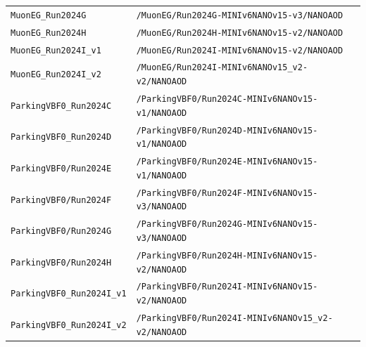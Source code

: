 \begin{longtable}{@{}>{\RaggedRight\arraybackslash}p{} >{\RaggedRight\arraybackslash}p{}@{}}
\addlinespace[2pt]
\texttt{MuonEG\_\allowbreak{}Run2024G} & \texttt{/\allowbreak{}MuonEG/\allowbreak{}Run2024G-\allowbreak{}MINIv6NANOv15-\allowbreak{}v3/\allowbreak{}NANOAOD} \\
\addlinespace[2pt]
\texttt{MuonEG\_\allowbreak{}Run2024H} & \texttt{/\allowbreak{}MuonEG/\allowbreak{}Run2024H-\allowbreak{}MINIv6NANOv15-\allowbreak{}v2/\allowbreak{}NANOAOD} \\
\addlinespace[2pt]
\texttt{MuonEG\_\allowbreak{}Run2024I\_\allowbreak{}v1} & \texttt{/\allowbreak{}MuonEG/\allowbreak{}Run2024I-\allowbreak{}MINIv6NANOv15-\allowbreak{}v2/\allowbreak{}NANOAOD} \\
\addlinespace[2pt]
\texttt{MuonEG\_\allowbreak{}Run2024I\_\allowbreak{}v2} & \texttt{/\allowbreak{}MuonEG/\allowbreak{}Run2024I-\allowbreak{}MINIv6NANOv15\_\allowbreak{}v2-\allowbreak{}v2/\allowbreak{}NANOAOD} \\
\addlinespace[2pt]
\texttt{ParkingVBF0\_\allowbreak{}Run2024C} & \texttt{/\allowbreak{}ParkingVBF0/\allowbreak{}Run2024C-\allowbreak{}MINIv6NANOv15-\allowbreak{}v1/\allowbreak{}NANOAOD} \\
\addlinespace[2pt]
\texttt{ParkingVBF0\_\allowbreak{}Run2024D} & \texttt{/\allowbreak{}ParkingVBF0/\allowbreak{}Run2024D-\allowbreak{}MINIv6NANOv15-\allowbreak{}v1/\allowbreak{}NANOAOD} \\
\addlinespace[2pt]
\texttt{ParkingVBF0/\allowbreak{}Run2024E} & \texttt{/\allowbreak{}ParkingVBF0/\allowbreak{}Run2024E-\allowbreak{}MINIv6NANOv15-\allowbreak{}v1/\allowbreak{}NANOAOD} \\
\addlinespace[2pt]
\texttt{ParkingVBF0/\allowbreak{}Run2024F} & \texttt{/\allowbreak{}ParkingVBF0/\allowbreak{}Run2024F-\allowbreak{}MINIv6NANOv15-\allowbreak{}v3/\allowbreak{}NANOAOD} \\
\addlinespace[2pt]
\texttt{ParkingVBF0/\allowbreak{}Run2024G} & \texttt{/\allowbreak{}ParkingVBF0/\allowbreak{}Run2024G-\allowbreak{}MINIv6NANOv15-\allowbreak{}v3/\allowbreak{}NANOAOD} \\
\addlinespace[2pt]
\texttt{ParkingVBF0/\allowbreak{}Run2024H} & \texttt{/\allowbreak{}ParkingVBF0/\allowbreak{}Run2024H-\allowbreak{}MINIv6NANOv15-\allowbreak{}v2/\allowbreak{}NANOAOD} \\
\addlinespace[2pt]
\texttt{ParkingVBF0\_\allowbreak{}Run2024I\_\allowbreak{}v1} & \texttt{/\allowbreak{}ParkingVBF0/\allowbreak{}Run2024I-\allowbreak{}MINIv6NANOv15-\allowbreak{}v2/\allowbreak{}NANOAOD} \\
\addlinespace[2pt]
\texttt{ParkingVBF0\_\allowbreak{}Run2024I\_\allowbreak{}v2} & \texttt{/\allowbreak{}ParkingVBF0/\allowbreak{}Run2024I-\allowbreak{}MINIv6NANOv15\_\allowbreak{}v2-\allowbreak{}v2/\allowbreak{}NANOAOD} \\

\end{longtable}
